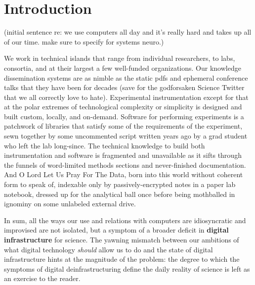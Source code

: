\documentclass{article}
\begin{document}
\hypertarget{introduction}{%
\section{Introduction}\label{introduction}}

(initial sentence re: we use computers all day and it's really hard and
takes up all of our time. make sure to specify for systems neuro.)

We work in technical islands that range from individual researchers, to
labs, consortia, and at their largest a few well-funded organizations.
Our knowledge dissemination systems are as nimble as the static pdfs and
ephemeral conference talks that they have been for decades (save for the
godforsaken Science Twitter that we all correctly love to hate).
Experimental instrumentation except for that at the polar extremes of
technological complexity or simplicity is designed and built custom,
locally, and on-demand. Software for performing experiments is a
patchwork of libraries that satisfy some of the requirements of the
experiment, sewn together by some uncommented script written years ago
by a grad student who left the lab long-since. The technical knowledge
to build both instrumentation and software is fragmented and unavailable
as it sifts through the funnels of word-limited methods sections and
never-finished documentation. And O Lord Let Us Pray For The Data, born
into this world without coherent form to speak of, indexable only by
passively-encrypted notes in a paper lab notebook, dressed up for the
analytical ball once before being mothballed in ignominy on some
unlabeled external drive.

In sum, all the ways our use and relations with computers are
idiosyncratic and improvised are not isolated, but a symptom of a
broader deficit in \textbf{digital infrastructure} for science. The
yawning mismatch between our ambitions of what digital technology
\emph{should} allow us to do and the state of digital infrastructure
hints at the magnitude of the problem: the degree to which the symptoms
of digital deinfrastructuring define the daily reality of science is
left as an exercise to the reader.
\end{document}
